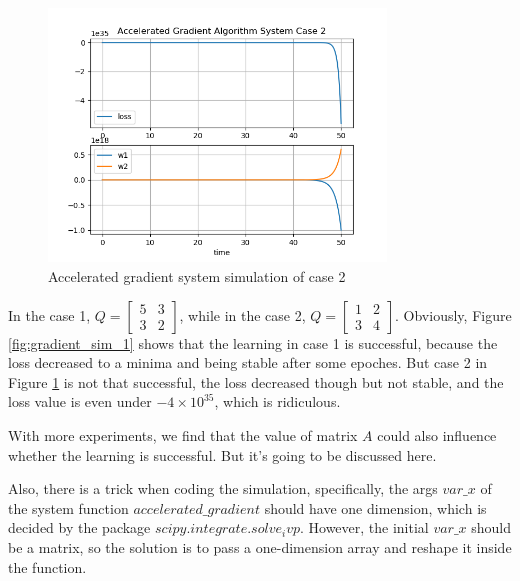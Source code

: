 \documentclass[titlepage]{article}
\begin{document}
\begin{figure}[htbp]
    \centering
    \includegraphics[width=0.8\textwidth]{img/accelerated_gradient_simulation_case_2.png}
    \caption{Accelerated gradient system simulation of case 2}
    \label{fig:gradient_sim_2}
\end{figure}

In the case 1, $Q=\begin{bmatrix} 5&3\\3&2 \end{bmatrix}$,
while in the case 2, $Q=\begin{bmatrix} 1&2\\3&4 \end{bmatrix}$.
Obviously, Figure \ref{fig:gradient_sim_1} shows that the learning in case 1 is successful,
because the loss decreased to a minima and being stable after some epoches.
But case 2 in Figure \ref{fig:gradient_sim_2} is not that successful,
the loss decreased though but not stable, and the loss value is even under $-4\times 10^{35}$,
which is ridiculous.

With more experiments, we find that the value of matrix $A$ could also influence
whether the learning is successful. But it's going to be discussed here.

Also, there is a trick when coding the simulation, specifically,
the args $var\_x$ of the system function $accelerated\_gradient$
should have one dimension, which is decided by the package $scipy.integrate.solve_ivp$.
However, the initial $var\_x$ should be a matrix, so the solution is to pass a
one-dimension array and reshape it inside the function.
\end{document}
